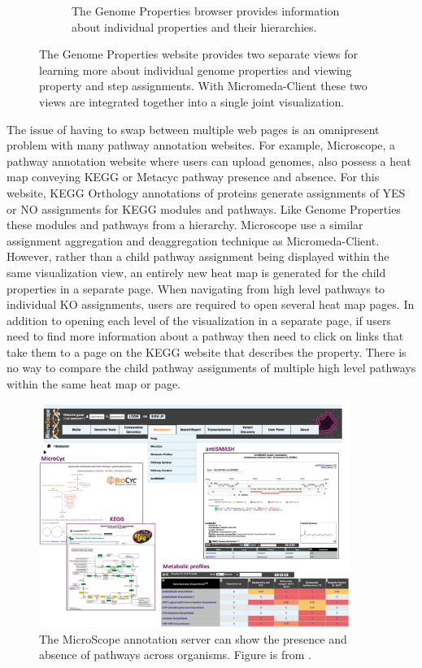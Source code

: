 \begin{figure}
\begin{subfigure}[b]{0.46\textwidth}
         \caption{The Genome Properties browser provides information about individual properties and their hierarchies.}
         \label{fig:property-browser}
     \end{subfigure}
     \caption{The Genome Properties website provides two separate views for learning more about individual genome properties and viewing property and step assignments. With Micromeda-Client these two views are integrated together into a single joint visualization.}
     \label{fig:genome-properties-interface}
\end{figure}

The issue of having to swap between multiple web pages is an omnipresent problem with many pathway annotation websites. For example, Microscope, a pathway annotation website where users can upload genomes, also possess a heat map conveying KEGG or Metacyc pathway presence and absence. For this website, KEGG Orthology annotations of proteins generate assignments of YES or NO assignments for KEGG modules and pathways. Like Genome Properties these modules and pathways from a hierarchy. Microscope use a similar assignment aggregation and deaggregation technique as Micromeda-Client. However, rather than a child pathway assignment being displayed within the same visualization view, an entirely new heat map is generated for the child properties in a separate page. When navigating from high level pathways to individual KO assignments, users are required to open several heat map pages. In addition to opening each level of the visualization in a separate page, if users need to find more information about a pathway then need to click on links that take them to a page on the KEGG website that describes the property. There is no way to compare the child pathway assignments of multiple high level pathways within the same heat map or page.

\begin{figure}[!ht]
  \centering
	\includegraphics[width=0.9\textwidth]{media/microscope.png}
	 \caption{The MicroScope annotation server can show the presence and absence of pathways across organisms. Figure is from \cite{vallenet2016microscope}.}
	 \label{fig:microscope}
\end{figure}


